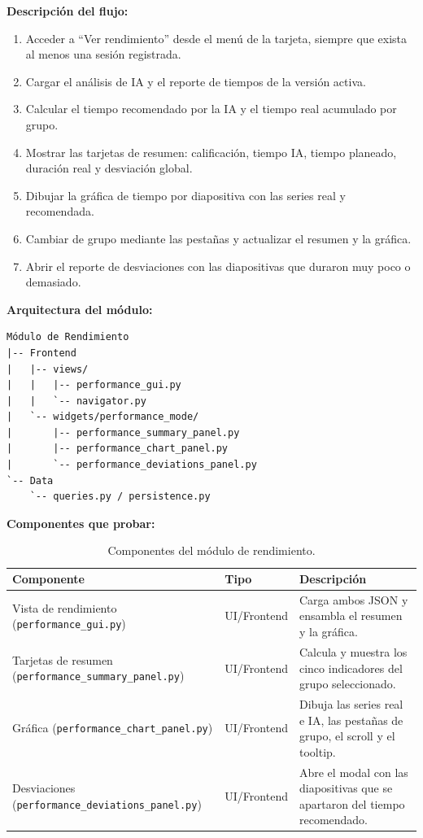 \documentclass[12pt,letterpaper]{article}
\begin{document}
\textbf{Descripción del flujo:}
\begin{enumerate}
    \item Acceder a ``Ver rendimiento'' desde el menú de la tarjeta, siempre que exista al menos una sesión registrada.
    \item Cargar el análisis de IA y el reporte de tiempos de la versión activa.
    \item Calcular el tiempo recomendado por la IA y el tiempo real acumulado por grupo.
    \item Mostrar las tarjetas de resumen: calificación, tiempo IA, tiempo planeado, duración real y desviación global.
    \item Dibujar la gráfica de tiempo por diapositiva con las series real y recomendada.
    \item Cambiar de grupo mediante las pestañas y actualizar el resumen y la gráfica.
    \item Abrir el reporte de desviaciones con las diapositivas que duraron muy poco o demasiado.
\end{enumerate}

\textbf{Arquitectura del módulo:}
\begin{verbatim}
Módulo de Rendimiento
|-- Frontend
|   |-- views/
|   |   |-- performance_gui.py
|   |   `-- navigator.py
|   `-- widgets/performance_mode/
|       |-- performance_summary_panel.py
|       |-- performance_chart_panel.py
|       `-- performance_deviations_panel.py
`-- Data
    `-- queries.py / persistence.py
\end{verbatim}

\textbf{Componentes que probar:}

\begin{table}[H]
    \centering
    \begin{tabular}{|L{0.34\textwidth}|L{0.18\textwidth}|L{0.38\textwidth}|}
        \hline
        \textbf{Componente} & \textbf{Tipo} & \textbf{Descripción} \\ \hline
        Vista de rendimiento (\texttt{performance\_gui.py}) & UI/Frontend & Carga ambos JSON y ensambla el resumen y la gráfica. \\ \hline
        Tarjetas de resumen (\texttt{performance\_summary\_panel.py}) & UI/Frontend & Calcula y muestra los cinco indicadores del grupo seleccionado. \\ \hline
        Gráfica (\texttt{performance\_chart\_panel.py}) & UI/Frontend & Dibuja las series real e IA, las pestañas de grupo, el scroll y el tooltip. \\ \hline
        Desviaciones (\texttt{performance\_deviations\_panel.py}) & UI/Frontend & Abre el modal con las diapositivas que se apartaron del tiempo recomendado. \\ \hline
    \end{tabular}
    \caption{Componentes del módulo de rendimiento.}
    \label{tab:componentes-modulo-rendimiento}
\end{table}
\end{document}
